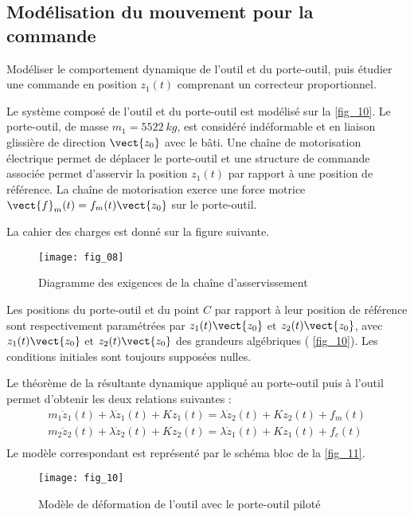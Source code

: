 \ifprof
\else
\begin{multicols}{2}
\fi

\subsection*{Modélisation du mouvement pour la commande}
\ifprof
\else
\begin{obj}
Modéliser le comportement dynamique de l’outil et du porte-outil, puis étudier une commande en
position $z_1(t)$ comprenant un correcteur proportionnel.
\end{obj}

Le système composé de l’outil et du porte-outil est modélisé sur la \autoref{fig_10}. Le porte-outil, de masse $m_1 = \SI{5522}{kg}$,
est considéré indéformable et en liaison glissière de direction $\vect{z_0}$ avec le bâti. Une chaîne de motorisation électrique
permet de déplacer le porte-outil et une structure de commande associée permet d’asservir la position
$z_1(t)$ par rapport à une position de référence. La chaîne de motorisation exerce une force motrice $\vect{f}_m(t) =f_m(t)\vect{z_0}$
sur le porte-outil.

La cahier des charges est donné sur la figure suivante.

\begin{figure}[H]
\centering
\texttt{[image: fig\_08]}
\caption{Diagramme des exigences de la chaîne d'asservissement \label{fig_08}}
\end{figure}

Les positions du porte-outil et du point $C$  par rapport à leur position de référence sont respectivement paramétrées
par $z_1(t)\vect{z_0}$ et $z_2(t)\vect{z_0}$, avec $z_1(t)\vect{z_0}$ et $z_2(t)\vect{z_0}$ des grandeurs algébriques ( \autoref{fig_10}). Les conditions initiales
sont toujours supposées nulles.


Le théorème de la résultante dynamique appliqué au porte-outil puis à l’outil permet d’obtenir les deux relations
suivantes :
$$
\begin{array}{l}
m_1\ddot{z}_1(t)+\lambda\dot{z}_1(t)+Kz_1(t) = \lambda\dot{z}_2(t)+Kz_2(t)+f_m(t) \\
m_2\ddot{z}_2(t)+\lambda\dot{z}_2(t)+Kz_2(t) = \lambda\dot{z}_1(t)+Kz_1(t)+f_c(t) \\
\end{array} $$
Le modèle correspondant est représenté par le schéma bloc de la  \autoref{fig_11}.

\begin{figure}[H]
\centering
\texttt{[image: fig\_10]}
\caption{Modèle de déformation de l'outil avec le porte-outil piloté \label{fig_10}}
\end{figure}


\end{multicols}
